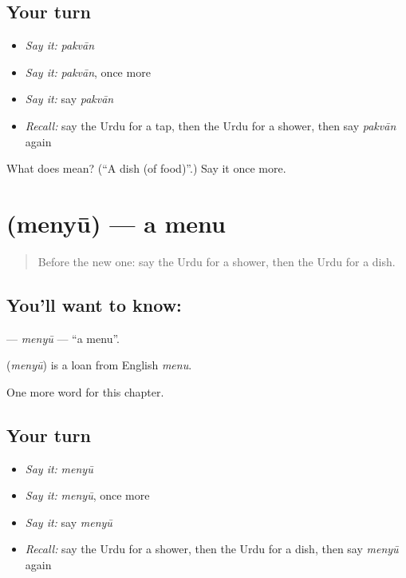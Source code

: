 \subsection*{Your turn}
\begin{itemize}
\raggedright
  \item \emph{Say it:} \emph{pakvān}
  \item \emph{Say it:} \emph{pakvān}, once more
  \item \emph{Say it:} say \emph{pakvān}
  \item \emph{Recall:} say the Urdu for a tap, then the Urdu for a shower, then say \emph{pakvān} again
\end{itemize}

\begin{tcolorbox}[breakable,colback=teal!4,colframe=teal!35!black,title={Before you move on}]
What does  mean? (\textquotedblleft{}A dish (of food)\textquotedblright{}.) Say it once more.
\end{tcolorbox}
\section[\texorpdfstring{\ur{مینیو} (menyū)}{مینیو (menyū)}]{ (menyū) — a menu}

\label{lesson:UR-C259-menyu}



\begin{quote}
Before the new one: say the Urdu for a shower, then the Urdu for a dish.
\end{quote}

\subsection*{You'll want to know: }
\textbf{} — \emph{menyū} — \textquotedblleft{}a menu\textquotedblright{}.

\begin{cousinweb}
\textbf{} (\emph{menyū}) is a loan from English \emph{menu}.
\end{cousinweb}

\begin{grammarlens}[title={What you've built}]
One more word for this chapter.
\end{grammarlens}

\subsection*{Your turn}
\begin{itemize}
\raggedright
  \item \emph{Say it:} \emph{menyū}
  \item \emph{Say it:} \emph{menyū}, once more
  \item \emph{Say it:} say \emph{menyū}
  \item \emph{Recall:} say the Urdu for a shower, then the Urdu for a dish, then say \emph{menyū} again
\end{itemize}

